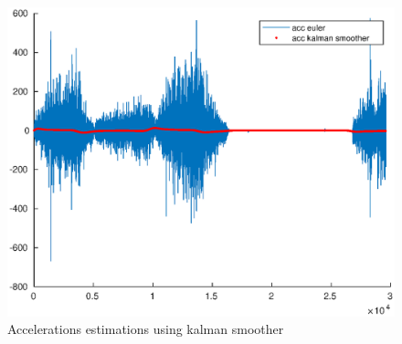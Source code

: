 \documentclass[a4paper,12pt]{article}
\begin{document}
\begin{figure}[H]
    \begin{center}
        \includegraphics[scale=0.7]{images/acc_sm.eps}
    \end{center}
    \caption{Accelerations estimations using kalman smoother}
    \label{fig:hw3_acc_sm}
\end{figure}
\end{document}
